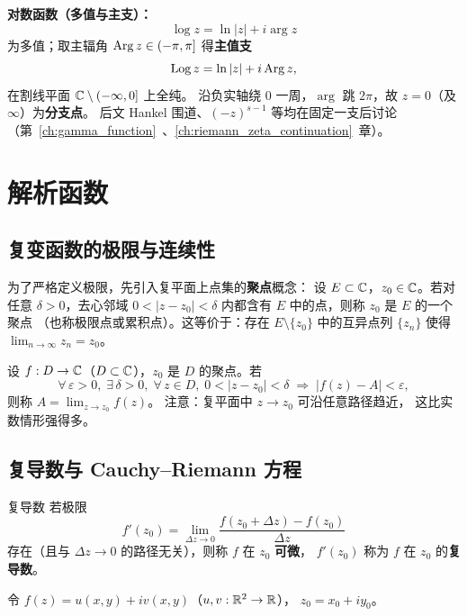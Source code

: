 \textbf{对数函数（多值与主支）：}
\[
  \log z=\ln|z|+i\arg z
\]
为多值；取主辐角 $\operatorname{Arg} z\in(-\pi,\pi]$ 得\textbf{主值支}
\[
  \operatorname{Log} z=\ln|z|+i\operatorname{Arg} z,
\]
在割线平面 $\mathbb{C}\setminus(-\infty,0]$ 上全纯。
沿负实轴绕 $0$ 一周，$\arg$ 跳 $2\pi$，故 $z=0$（及 $\infty$）为\textbf{分支点}。
后文 Hankel 围道、$(-z)^{s-1}$ 等均在固定一支后讨论（第~\ref{ch:gamma_function}~、\ref{ch:riemann_zeta_continuation}~章）。

\section{解析函数}

\subsection{复变函数的极限与连续性}

为了严格定义极限，先引入复平面上点集的\textbf{聚点}概念：
设 $E \subset \mathbb{C}$，$z_0 \in \mathbb{C}$。若对任意 $\delta > 0$，去心邻域
$0 < |z-z_0| < \delta$ 内都含有 $E$ 中的点，则称 $z_0$ 是 $E$ 的一个聚点
（也称极限点或累积点）。这等价于：存在 $E \setminus \{z_0\}$ 中的互异点列
$\{z_n\}$ 使得 $\lim_{n \to \infty} z_n = z_0$。

设 $f:D\to\mathbb{C}$（$D\subset\mathbb{C}$），$z_0$ 是 $D$ 的聚点。若
\[
  \forall\,\varepsilon>0,\;\exists\,\delta>0,\;\forall\,z\in D,\;0<|z-z_0|<\delta
  \;\Rightarrow\; |f(z)-A|<\varepsilon,
\]
则称 $A=\lim_{z\to z_0}f(z)$。
注意：复平面中 $z\to z_0$ 可沿任意路径趋近，
这比实数情形强得多。

\subsection{复导数与 Cauchy--Riemann 方程}

\begin{definition}{复导数}{}
\label{def:complex_deriv}
若极限
\begin{equation}
  f'(z_0) = \lim_{\Delta z\to 0}\frac{f(z_0+\Delta z)-f(z_0)}{\Delta z}
  \label{eq:complex_deriv}
\end{equation}
存在（且与 $\Delta z\to0$ 的路径无关），则称 $f$ 在 $z_0$ \textbf{可微}，
$f'(z_0)$ 称为 $f$ 在 $z_0$ 的\textbf{复导数}。
\end{definition}

令 $f(z)=u(x,y)+iv(x,y)$（$u,v:\mathbb{R}^2\to\mathbb{R}$），
$z_0=x_0+iy_0$。

